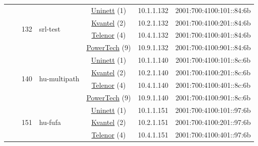 \begin{small}
\begin{center}
\begin{longtable}{|c|c|c|c|c|c|c|c|}
  &  & \multirow{4}{*}{\tiny{132}} & \multicolumn{1}{|l|}{\multirow{4}{*}{\tiny{srl-test}}} & \multicolumn{2}{|c|}{\tiny{\href{https://www.uninett.no}{Uninett} (1)}} & \tiny{10.1.1.132} & \tiny{2001:700:4100:101::84:6b} \\* \cline{5-5}\cline{6-6}\cline{7-7}\cline{8-8}
  &  &  &  & \multicolumn{2}{|c|}{\tiny{\href{http://kvantel.no}{Kvantel} (2)}} & \tiny{10.2.1.132} & \tiny{2001:700:4100:201::84:6b} \\* \cline{5-5}\cline{6-6}\cline{7-7}\cline{8-8}
  &  &  &  & \multicolumn{2}{|c|}{\tiny{\href{https://www.telenor.no}{Telenor} (4)}} & \tiny{10.4.1.132} & \tiny{2001:700:4100:401::84:6b} \\* \cline{5-5}\cline{6-6}\cline{7-7}\cline{8-8}
  &  &  &  & \multicolumn{2}{|c|}{\tiny{\href{http://www.powertech.no}{PowerTech} (9)}} & \tiny{10.9.1.132} & \tiny{2001:700:4100:901::84:6b} \\* \cline{3-3}\cline{4-4}\cline{5-5}\cline{6-6}\cline{7-7}\cline{8-8}
  &  & \multirow{4}{*}{\tiny{140}} & \multicolumn{1}{|l|}{\multirow{4}{*}{\tiny{hu-multipath}}} & \multicolumn{2}{|c|}{\tiny{\href{https://www.uninett.no}{Uninett} (1)}} & \tiny{10.1.1.140} & \tiny{2001:700:4100:101::8c:6b} \\* \cline{5-5}\cline{6-6}\cline{7-7}\cline{8-8}
  &  &  &  & \multicolumn{2}{|c|}{\tiny{\href{http://kvantel.no}{Kvantel} (2)}} & \tiny{10.2.1.140} & \tiny{2001:700:4100:201::8c:6b} \\* \cline{5-5}\cline{6-6}\cline{7-7}\cline{8-8}
  &  &  &  & \multicolumn{2}{|c|}{\tiny{\href{https://www.telenor.no}{Telenor} (4)}} & \tiny{10.4.1.140} & \tiny{2001:700:4100:401::8c:6b} \\* \cline{5-5}\cline{6-6}\cline{7-7}\cline{8-8}
  &  &  &  & \multicolumn{2}{|c|}{\tiny{\href{http://www.powertech.no}{PowerTech} (9)}} & \tiny{10.9.1.140} & \tiny{2001:700:4100:901::8c:6b} \\* \cline{3-3}\cline{4-4}\cline{5-5}\cline{6-6}\cline{7-7}\cline{8-8}
  &  & \multirow{4}{*}{\tiny{151}} & \multicolumn{1}{|l|}{\multirow{4}{*}{\tiny{hu-fufa}}} & \multicolumn{2}{|c|}{\tiny{\href{https://www.uninett.no}{Uninett} (1)}} & \tiny{10.1.1.151} & \tiny{2001:700:4100:101::97:6b} \\* \cline{5-5}\cline{6-6}\cline{7-7}\cline{8-8}
  &  &  &  & \multicolumn{2}{|c|}{\tiny{\href{http://kvantel.no}{Kvantel} (2)}} & \tiny{10.2.1.151} & \tiny{2001:700:4100:201::97:6b} \\* \cline{5-5}\cline{6-6}\cline{7-7}\cline{8-8}
  &  &  &  & \multicolumn{2}{|c|}{\tiny{\href{https://www.telenor.no}{Telenor} (4)}} & \tiny{10.4.1.151} & \tiny{2001:700:4100:401::97:6b} \\* \cline{5-5}\cline{6-6}\cline{7-7}\cline{8-8}

\end{longtable}
\end{center}
\end{small}
